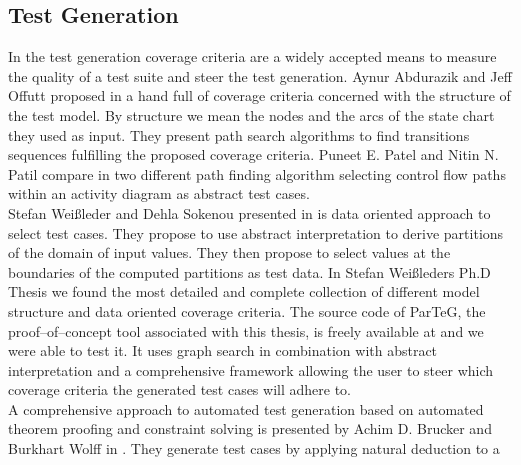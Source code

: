 \subsection{Test Generation}
In the test generation coverage criteria are a widely accepted means to measure the quality of a test suite and steer the test generation. Aynur Abdurazik and Jeff Offutt proposed in \cite{Offutt:1999:GeneratingTestsFromUmlSpec} a hand full of coverage criteria concerned with the structure of the test model. By structure we mean the nodes and the arcs of the state chart they used as input. They present path search algorithms to find transitions sequences fulfilling the proposed coverage criteria.
Puneet E. Patel and Nitin N. Patil compare in \cite{Patel12TestCaseFormationUsigUMLActivityDiagram} two different path finding algorithm selecting control flow paths within an activity diagram as abstract test cases.\\
Stefan Wei{\ss}leder and Dehla Sokenou presented in \cite{weissleder2008automatic} is data oriented approach to select test cases. They propose to use abstract interpretation to derive partitions of the domain of input values. They then propose to select values at the boundaries of the computed partitions as test data.
In Stefan Wei{\ss}leders Ph.D Thesis \cite{ParTeG} we found the most detailed and complete collection of different model structure and data oriented coverage criteria. The source code of ParTeG, the proof--of--concept tool associated with this thesis, is freely available at \cite{sf.parteg} and we were able to test it. It uses graph search in combination with abstract interpretation and a comprehensive framework allowing the user to steer which coverage criteria the generated test cases will adhere to.\\
A comprehensive approach to automated test generation based on automated theorem proofing and constraint solving is presented by Achim D. Brucker and Burkhart Wolff in \cite{brucker2012theoremProverBasedTesting}. They generate test cases by applying natural deduction to a %
